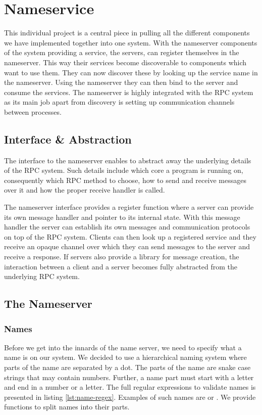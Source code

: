 \chapter{Nameservice}

This individual project is a central piece in pulling all the different components we have implemented
together into one system. With the nameserver components of the system providing a service, the servers,
can register themselves in the nameserver. This way their services become discoverable to components
which want to use them. They can now discover these by looking up the service name in the nameserver.
Using the nameserver they can then bind to the server and consume the services. The nameserver is highly
integrated with the RPC system as its main job apart from discovery is setting up communication channels
between processes.

\section{Interface \& Abstraction}
The interface to the nameserver enables to abstract away the underlying details of the RPC system. Such
details include which core a program is running on, consequently which RPC method to choose, how to send
and receive messages over it and how the proper receive handler is called.

The nameserver interface provides a register function where a server can provide its own message handler
and pointer to its internal state. With this message handler the server can establish its own messages
and communication protocols on top of the RPC system. Clients can then look up a registered service and
they receive an opaque channel over which they can send messages to the server and receive a response.
If servers also provide a library for message creation, the interaction between a client and a server
becomes fully abstracted from the underlying RPC system.

\section{The Nameserver}
\subsection{Names}
Before we get into the innards of the name server, we need to specify what a name is on our system.
We decided to use a hierarchical naming system where parts of the name are separated by a dot. The
parts of the name are snake case strings that may contain numbers. Further, a name part must start 
with a letter and end in a number or a letter. The full regular expressions to validate names is presented in
listing \ref{lst:name-regex}. Examples of such names are  or .
We provide functions to split names into their parts.

